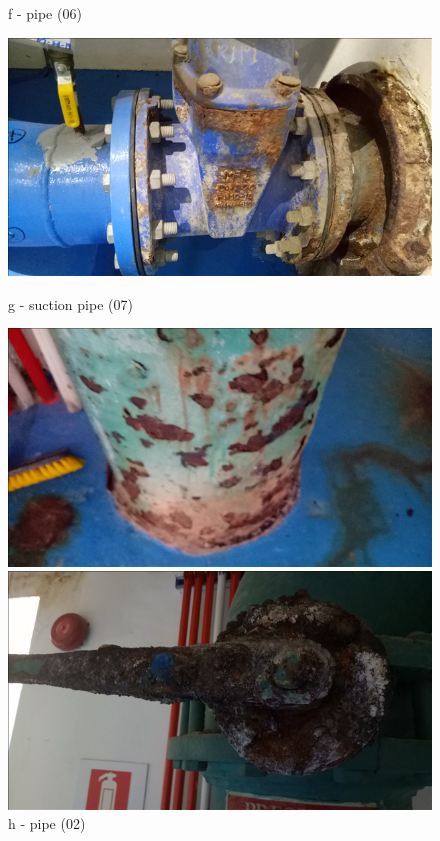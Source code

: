 \begin{figure}[!htb]
\begin{minipage}[b]{0.2\linewidth}
		\caption*{f - pipe (06)}
		\label{ch043_discharge_pipe_deteriorationF}
	\end{minipage}
\hspace{0.05cm}
	\begin{minipage}[b]{0.2\linewidth}
	\centering
	\includegraphics[width=\textwidth]{figures/ch043_old_suction_pipeA}
	\caption*{g - suction pipe (07)}
	\label{ch043_old_suction_pipeA}
\end{minipage}
\hspace{0.05cm}
\begin{minipage}[b]{0.2\linewidth}
	\centering
	\includegraphics[width=\textwidth]{figures/ch043_discharge_pipe_deteriorationB}
	\caption*{h - pipe (02)}
	\label{ch043_old_suction_pipeB}
\end{minipage}
\hspace{0.05cm}
\begin{minipage}[b]{0.3\linewidth}
	\centering
	\includegraphics[width=\textwidth]{figures/ch043_prv_corroded_manual_switch}

\end{minipage}
\end{figure}
